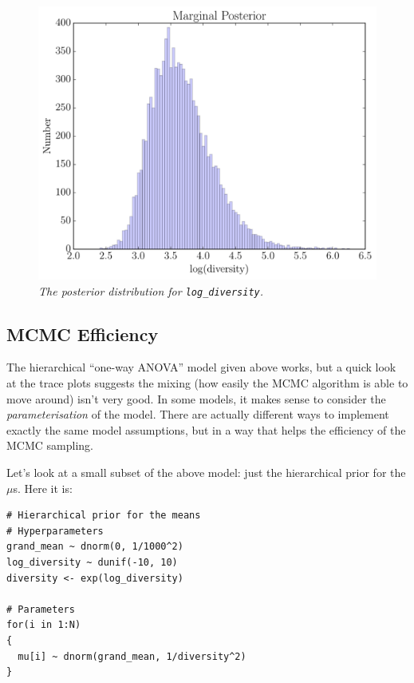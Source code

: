 \begin{figure}[!ht]
\begin{center}
\includegraphics[scale=0.6]{Figures/diversity.pdf}
\caption{\it The posterior distribution for {\tt log\_diversity}.\label{fig:diversity}}
\end{center}
\end{figure}

\subsection{MCMC Efficiency}
The hierarchical ``one-way ANOVA'' model given above works, but a quick look
at the trace plots suggests the mixing (how easily the MCMC algorithm is
able to move around) isn't very good. In some models, it makes sense to
consider the {\it parameterisation} of the model. There are actually different
ways to implement exactly the same model assumptions, but in a way that helps
the efficiency of the MCMC sampling.

Let's look at a small subset of the above model: just the hierarchical prior
for the $\mu$s. Here it is:

\begin{verbatim}
# Hierarchical prior for the means
# Hyperparameters
grand_mean ~ dnorm(0, 1/1000^2)
log_diversity ~ dunif(-10, 10)
diversity <- exp(log_diversity)

# Parameters
for(i in 1:N)
{
  mu[i] ~ dnorm(grand_mean, 1/diversity^2)
}
\end{verbatim}


